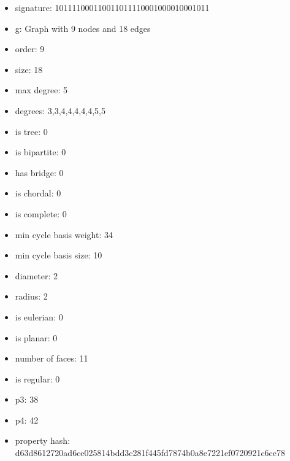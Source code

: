 \newpage
\begin{figure}
\end{figure}
\begin{itemize}
\item signature: 101111000110011011110001000010001011
\item g: Graph with 9 nodes and 18 edges
\item order: 9
\item size: 18
\item max degree: 5
\item degrees: 3,3,4,4,4,4,4,5,5
\item is tree: 0
\item is bipartite: 0
\item has bridge: 0
\item is chordal: 0
\item is complete: 0
\item min cycle basis weight: 34
\item min cycle basis size: 10
\item diameter: 2
\item radius: 2
\item is eulerian: 0
\item is planar: 0
\item number of faces: 11
\item is regular: 0
\item p3: 38
\item p4: 42
\item property hash: d63d8612720ad6ce025814bdd3c281f445fd7874b0a8e7221ef0720921c6ce78
\end{itemize}

